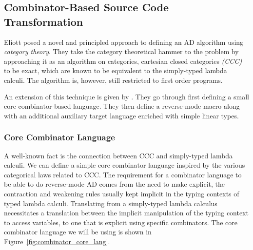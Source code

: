 \subsection{Combinator-Based Source Code Transformation}\label{sec:combinator-base}
  Eliott posed a novel and principled approach to defining an AD algorithm using \textit{category theory}\cite{Elliott-2018-ad-icfp}.
  They take the category theoretical hammer to the problem by approaching it as an algorithm on categories, cartesian closed categories \textit{(CCC)} to be exact, which are known to be equivalent to the simply-typed lambda calculi\cite{Elliott-2017-compiling-to-categories}\cite{10.1007/3-540-15198-2_10}.
  The algorithm is, however, still restricted to first order programs.

  An extension of this technique is given by \Vakar{}\cite{Vakar-combinator}.
  They go through first defining a small core combinator-based language.
  They then define a reverse-mode macro along with an additional auxiliary target language enriched with simple linear types.


  \subsubsection{Core Combinator Language}\label{sec:combinator-core}
    A well-known fact is the connection between CCC and simply-typed lambda calculi\cite{10.1007/3-540-15198-2_10}.
    We can define a simple core combinator language inspired by the various categorical laws related to CCC.
    The requirement for a combinator language to be able to do reverse-mode AD comes from the need to make explicit, the contraction and weakening rules usually kept implicit in the typing contexts of typed lambda calculi.
    Translating from a simply-typed lambda calculus necessitates a translation between the implicit manipulation of the typing context to access variables, to one that is explicit using specific combinators.
    The core combinator language we will be using is shown in Figure~\ref{fig:combinator_core_lang}.


